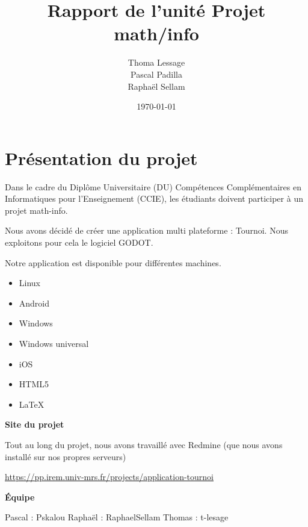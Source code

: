 \documentclass[10pt]{article}
\title{Rapport de l'unité Projet math/info}
\author{    Thoma Lessage\\
            Pascal Padilla\\
            Raphaël Sellam
    }
\date{\today}
\begin{document}
\pagecolor{orangeamu!25}
\maketitle\thispagestyle{empty}





\newpage\pagecolor{orangeamu!10}
\tableofcontents







\newpage
\nopagecolor
\part{Présentation du projet}

Dans le cadre du Diplôme Universitaire (DU) Compétences Complémentaires en Informatiques pour l'Enseignement (CCIE), les étudiants doivent participer à un projet math-info.

Nous avons décidé de créer une application multi plateforme : Tournoi. Nous exploitons pour cela le logiciel GODOT.

Notre application est disponible pour différentes machines.

\begin{itemize}
    \item Linux
    \item Android
    \item Windows
    \item Windows universal
    \item iOS
    \item HTML5
    \item LaTeX
\end{itemize}


\textbf{Site du projet}


Tout au long du projet, nous avons travaillé avec Redmine (que nous avons installé sur nos propres serveurs)

\url{https://pp.irem.univ-mrs.fr/projects/application-tournoi}


\textbf{Équipe}

    Pascal : Pskalou
    Raphaël : RaphaelSellam
    Thomas : t-lesage


\newpage
{}
\newpage
{}
\newpage
{}
\end{document}
